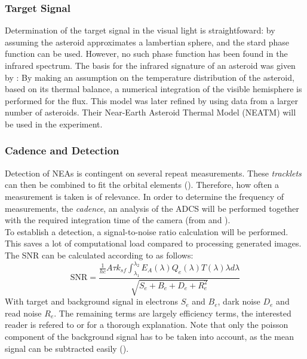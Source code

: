 \documentclass[12pt, english, NoHyper]{AE4010-template}
\begin{document}
\subsubsection{Target Signal}
Determination of the target signal in the visual light is straightfoward: by assuming the asteroid approximates a lambertian sphere, and the stard phase function can be used. However, no such phase function has been found in the infrared spectrum. The basis for the infrared signature of an asteroid was given by \cite{AsteroidSTM}: By making an assumption on the temperature distribution of the asteroid, based on its thermal balance, a numerical integration of the visible hemisphere is performed for the flux. This model was later refined by \cite{AsteroidsInTIR} using data from a larger number of asteroids. Their Near-Earth Asteroid Thermal Model (NEATM) will be used in the experiment.

\subsubsection{Cadence and Detection}
Detection of NEAs is contingent on several repeat measurements. These \textit{tracklets} can then be combined to fit the orbital elements (\cite{OpNav}). Therefore, how often a measurement is taken is of relevance. In order to determine the frequency of measurements, the \textit{cadence}, an analysis of the ADCS will be performed together with the required integration time of the camera (from \cite{NEOSDT2} and \cite{ThesisOlga}). \\

To establish a detection, a signal-to-noise ratio calculation will be performed. This saves a lot of computational load compared to processing generated images. The SNR can be calculated according to \cite{NEODetection} as follows:
\begin{equation}
\mathrm{SNR} = \frac{\frac{1}{hc}A\tau k_{sf} \int_{\lambda_1}^{\lambda_2}E_A(\lambda)Q_e(\lambda)T(\lambda)\lambda d \lambda}{\sqrt{S_e + B_e + D_e + R_e^2}}
\end{equation}
With target and background signal in electrons $S_e$ and $B_e$, dark noise $D_e$ and read noise $R_e$. The remaining terms are largely efficiency terms, the interested reader is refered to \cite{NEODetection} or \cite{OpNav} for a thorough explanation. Note that only the poisson component of the background signal has to be taken into account, as the mean signal can be subtracted easily (\cite{OpNav}).\\
\end{document}

